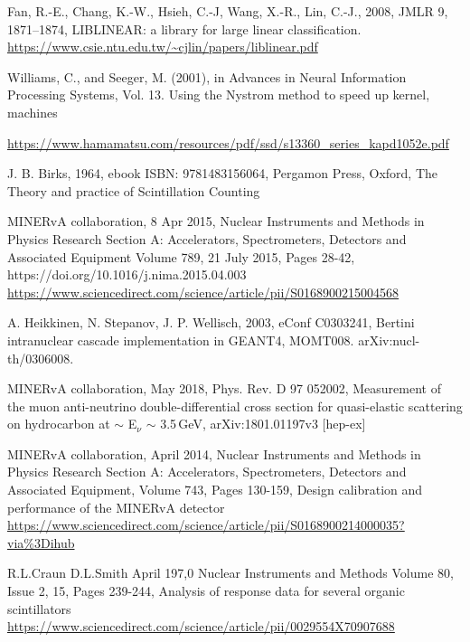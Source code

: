 \documentclass[12pt,a4paper]{article}
\begin{document}
\begin{thebibliography}{9}
 Fan, R.-E., Chang, K.-W., Hsieh, C.-J, Wang, X.-R., Lin, C.-J., 2008, JMLR 9, 1871–1874, LIBLINEAR: a library for large linear classification.  \url{https://www.csie.ntu.edu.tw/~cjlin/papers/liblinear.pdf}

Williams, C., and Seeger, M. (2001), in Advances in Neural Information Processing Systems, Vol. 13. Using the Nystrom method to speed up kernel, machines

\url{https://www.hamamatsu.com/resources/pdf/ssd/s13360_series_kapd1052e.pdf}

J. B. Birks, 1964, ebook ISBN: 9781483156064, Pergamon Press, Oxford, The Theory and practice of Scintillation Counting

MINERvA collaboration, 8 Apr 2015, Nuclear Instruments and Methods in Physics Research Section A: Accelerators, Spectrometers, Detectors and Associated Equipment Volume 789, 21 July 2015, Pages 28-42, https://doi.org/10.1016/j.nima.2015.04.003 \url{https://www.sciencedirect.com/science/article/pii/S0168900215004568}

A. Heikkinen, N. Stepanov, J. P. Wellisch, 2003, eConf C0303241, Bertini intranuclear cascade implementation in GEANT4,  MOMT008. arXiv:nucl-th/0306008.

MINERvA collaboration, May 2018, Phys. Rev. D 97 052002, Measurement of the muon anti-neutrino double-differential cross section for quasi-elastic scattering on hydrocarbon at $\sim$ E$_\nu$ $\sim$ 3.5\,GeV, arXiv:1801.01197v3 [hep-ex]

MINERvA collaboration, April 2014, Nuclear Instruments and Methods in Physics Research Section A: Accelerators, Spectrometers, Detectors and Associated Equipment, Volume 743, Pages 130-159, Design calibration and performance of the MINERvA detector \url{https://www.sciencedirect.com/science/article/pii/S0168900214000035?via\%3Dihub}

R.L.Craun D.L.Smith  April 197,0 Nuclear Instruments and Methods Volume 80, Issue 2, 15, Pages 239-244, Analysis of response data for several organic scintillators \url{https://www.sciencedirect.com/science/article/pii/0029554X70907688}



\end{thebibliography}


\newpage
\appendix
\end{document}
